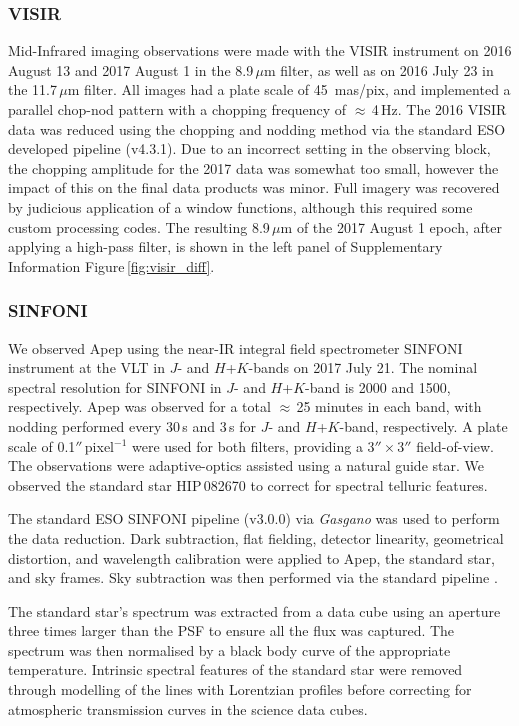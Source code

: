 \documentclass[preprint,times]{aastex61}
\begin{document}
\subsubsection{VISIR}

Mid-Infrared imaging observations were made with the VISIR instrument \citep{2004Msngr.117...12L} on 2016 August 13 and 2017 August 1 in the 8.9\,$\mu$m filter, as well as on 2016 July 23 in the 11.7\,$\mu$m filter. All images had a plate scale of 45~mas/pix, and implemented a parallel chop-nod pattern with a chopping frequency of $\approx$\,4\,Hz. The 2016 VISIR data was reduced using the chopping and nodding method via the standard ESO developed pipeline (v4.3.1). Due to an incorrect setting in the observing block, the chopping amplitude for the 2017 data was somewhat too small, however the impact of this on the final data products was minor. Full imagery was recovered by judicious application of a window functions, although this required some custom processing codes. The resulting 8.9\,$\mu$m of the 2017 August 1 epoch, after applying a high-pass filter, is shown in the left panel of Supplementary Information Figure\,\ref{fig:visir_diff}.

\subsubsection{SINFONI}

We observed Apep using the near-IR integral field spectrometer SINFONI instrument \citep{2003SPIE.4841.1548E} at the VLT in $J$- and $H$+$K$-bands on 2017 July 21. The nominal spectral resolution for SINFONI in $J$- and $H$+$K$-band is 2000 and 1500, respectively. Apep was observed for a total $\approx$\,25 minutes in each band, with nodding performed every 30\,s and 3\,s for $J$- and $H$+$K$-band, respectively. A plate scale of 0.1$''$\,pixel$^{-1}$ were used for both filters, providing a $3'' \times 3''$ field-of-view. The observations were adaptive-optics assisted using a natural guide star. We observed the standard star HIP\,082670 to correct for spectral telluric features. 

The standard ESO SINFONI pipeline (v3.0.0) via \emph{Gasgano} was used to perform the data reduction. Dark subtraction, flat fielding, detector linearity, geometrical distortion, and wavelength calibration were applied to Apep, the standard star, and sky frames. Sky subtraction was then performed via the standard pipeline \citep{2007MNRAS.375.1099D}. 

The standard star's spectrum was extracted from a data cube using an aperture three times larger than the PSF to ensure all the flux was captured. The spectrum was then normalised by a black body curve of the appropriate temperature. Intrinsic spectral features of the standard star were removed through modelling of the lines with Lorentzian profiles before correcting for atmospheric transmission curves in the science data cubes.
\end{document}
